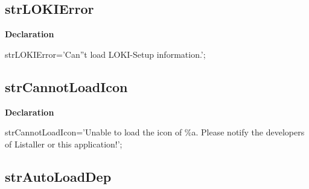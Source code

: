 \documentclass{report}
\newif\ifpdf
\begin{document}
\subsection*{strLOKIError}
\fi
\label{trstrings-strLOKIError}
\begin{list}{}{
\setlength{\itemindent}{0cm}
\setlength{\listparindent}{0cm}
\setlength{\leftmargin}{\evensidemargin}
\addtolength{\leftmargin}{\tmplength}
\settowidth{\labelsep}{X}
\addtolength{\leftmargin}{\labelsep}
\setlength{\labelwidth}{\tmplength}
}
\item[\textbf{Declaration}\hfill]
\ifpdf
\begin{flushleft}
\fi
\begin{ttfamily}
strLOKIError='Can''t load LOKI-Setup information.';\end{ttfamily}

\ifpdf
\end{flushleft}
\fi

\end{list}
\ifpdf
\subsection*{\large{\textbf{strCannotLoadIcon}}\normalsize\hspace{1ex}\hrulefill}
\else
\subsection*{strCannotLoadIcon}
\fi
\label{trstrings-strCannotLoadIcon}
\begin{list}{}{
\setlength{\itemindent}{0cm}
\setlength{\listparindent}{0cm}
\setlength{\leftmargin}{\evensidemargin}
\addtolength{\leftmargin}{\tmplength}
\settowidth{\labelsep}{X}
\addtolength{\leftmargin}{\labelsep}
\setlength{\labelwidth}{\tmplength}
}
\item[\textbf{Declaration}\hfill]
\ifpdf
\begin{flushleft}
\fi
\begin{ttfamily}
strCannotLoadIcon='Unable to load the icon of {\%}a. Please notify the developers of Listaller or this application!';\end{ttfamily}

\ifpdf
\end{flushleft}
\fi

\end{list}
\ifpdf
\subsection*{\large{\textbf{strAutoLoadDep}}\normalsize\hspace{1ex}\hrulefill}
\else
\end{document}
